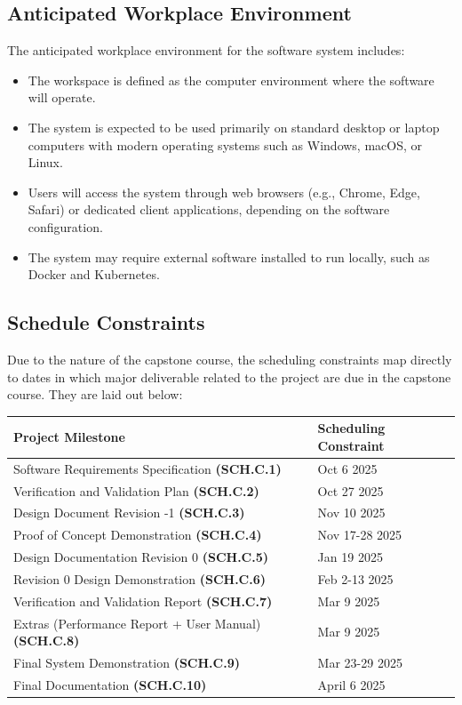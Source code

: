 \documentclass[12pt]{article}
\begin{document}
\subsection{Anticipated Workplace Environment}

The anticipated workplace environment for the software system includes:

\begin{itemize}
    \item The workspace is defined as the computer environment where the software will operate.
    \item The system is expected to be used primarily on standard desktop or laptop computers with modern operating systems such as Windows, macOS, or Linux.
    \item Users will access the system through web browsers (e.g., Chrome, Edge, Safari) or dedicated client applications, depending on the software configuration.
    \item The system may require external software installed to run locally, such as Docker and Kubernetes.
\end{itemize}

\subsection{Schedule Constraints}

\par{Due to the nature of the capstone course, the scheduling constraints
map directly to dates in which major deliverable related to the project are due in the capstone course.
They are laid out below:}

\begin{tabular}{|m{5cm}|m{10cm}|}
    \hline
    Project Milestone & Scheduling Constraint \\
    \hline
    Software Requirements Specification \textbf{(SCH.C.1)} & Oct 6 2025 \\
    \hline
    Verification and Validation Plan \textbf{(SCH.C.2)} & Oct 27 2025\\
    \hline
    Design Document Revision -1 \textbf{(SCH.C.3)} & Nov 10 2025\\
    \hline
    Proof of Concept Demonstration \textbf{(SCH.C.4)} & Nov 17-28 2025\\
    \hline
    Design Documentation Revision 0 \textbf{(SCH.C.5)} & Jan 19 2025\\
    \hline
    Revision 0 Design Demonstration \textbf{(SCH.C.6)} & Feb 2-13 2025\\
    \hline
    Verification and Validation Report \textbf{(SCH.C.7)}  & Mar 9 2025\\
    \hline
    Extras (Performance Report + User Manual) \textbf{(SCH.C.8)} & Mar 9 2025\\
    \hline
    Final System Demonstration \textbf{(SCH.C.9)} & Mar 23-29 2025\\
    \hline
    Final Documentation \textbf{(SCH.C.10)} & April 6 2025\\
    \hline
\end{tabular}
\end{document}
